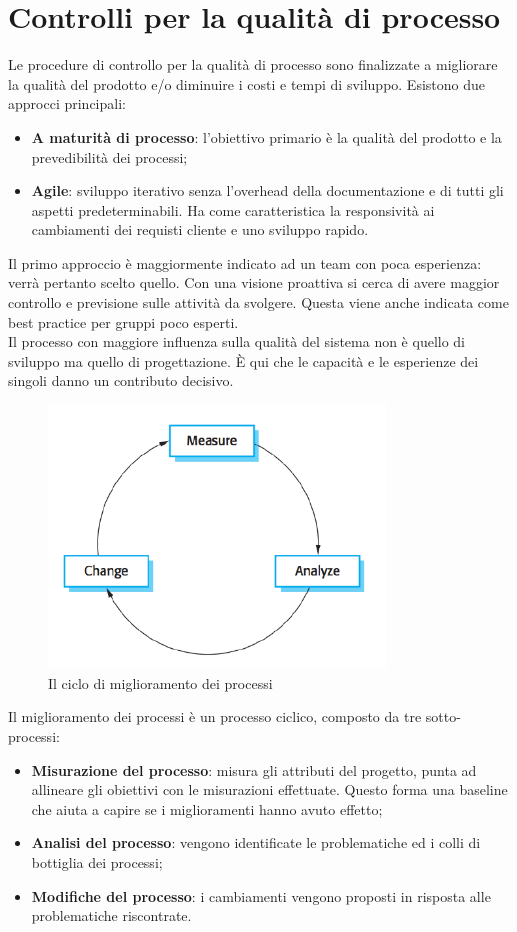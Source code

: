 \section{Controlli per la qualità di processo}
Le procedure di controllo per la qualità di processo sono finalizzate a migliorare la qualità del prodotto e/o diminuire i costi e tempi di sviluppo. Esistono due approcci principali:
\begin{itemize}
\item \textbf{A maturità di processo}: l'obiettivo primario è la qualità del prodotto e la prevedibilità dei processi;
\item \textbf{Agile}: sviluppo iterativo senza l'overhead della documentazione e di tutti gli aspetti predeterminabili. Ha come caratteristica la responsività ai cambiamenti dei requisti cliente e uno sviluppo rapido.
\end{itemize}
Il primo approccio è maggiormente indicato ad un team con poca esperienza: verrà pertanto scelto quello. Con una visione proattiva si cerca di avere maggior controllo e previsione sulle attività da svolgere. Questa viene anche indicata come best practice per gruppi poco esperti.\\
Il processo con maggiore influenza sulla qualità del sistema non è quello di sviluppo ma quello di progettazione. È qui che le capacità e le esperienze dei singoli danno un contributo decisivo.\\
\begin{figure}[h]
\centering \includegraphics[width=0.8\textwidth]{processImprovement.png}
\caption{Il ciclo di miglioramento dei processi}
\end{figure}
Il miglioramento dei processi è un processo ciclico, composto da tre sotto-processi:
\begin{itemize}
\item \textbf{Misurazione del processo}: misura gli attributi del progetto, punta ad allineare gli obiettivi con le misurazioni effettuate. Questo forma una baseline che aiuta a capire se i miglioramenti hanno avuto effetto;
\item \textbf{Analisi del processo}: vengono identificate le problematiche ed i colli di bottiglia dei processi;
\item \textbf{Modifiche del processo}: i cambiamenti vengono proposti in risposta alle problematiche riscontrate.
\end{itemize}
